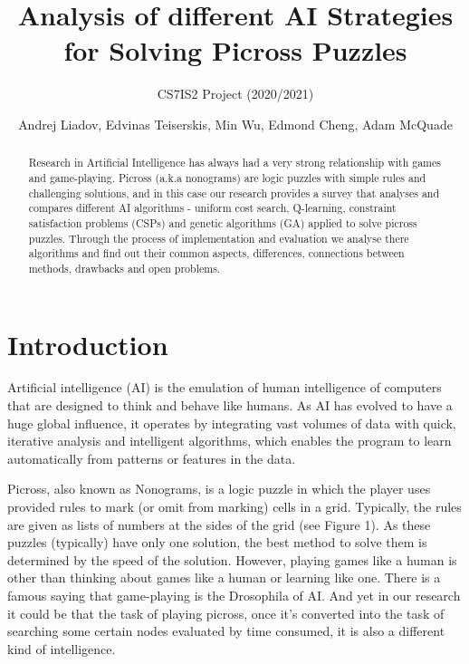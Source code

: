 \documentclass{svproc}
\begin{document}
\mainmatter
\title{Analysis of different AI Strategies for Solving Picross Puzzles}
\subtitle{CS7IS2 Project (2020/2021)}
\author{Andrej Liadov, Edvinas Teiserskis, Min Wu, Edmond Cheng, Adam McQuade}

\maketitle              %


\begin{abstract}
Research in Artificial Intelligence has always had a very strong relationship with games and game-playing. Picross (a.k.a nonograms) are logic puzzles with simple rules and challenging solutions, and in this case our research provides a survey that analyses and compares different AI algorithms - uniform cost search, Q-learning, constraint satisfaction problems (CSPs) and genetic algorithms (GA) applied to solve picross puzzles. Through the process of implementation and evaluation we analyse there algorithms and find out their common aspects, differences, connections between methods, drawbacks and open problems.
\end{abstract}


\section{Introduction}
Artificial intelligence (AI) is the emulation of human intelligence of computers that are designed to think and behave like humans. As AI has evolved to have a huge global influence, it operates by integrating vast volumes of data with quick, iterative analysis and intelligent algorithms, which enables the program to learn automatically from patterns or features in the data.

Picross, also known as Nonograms, is a logic puzzle in which the player uses provided rules to mark (or omit from marking) cells in a grid. Typically, the rules are given as lists of numbers at the sides of the grid (see Figure 1). As these puzzles (typically) have only one solution, the best method to solve them is determined by the speed of the solution. However, playing games like a human is other than thinking about games like a human or learning like one. There is a famous saying that game-playing is the Drosophila of AI. And yet in our research it could be that the task of playing picross, once it’s converted into the task of searching some certain nodes evaluated by time consumed, it is also a different kind of intelligence.
\end{document}
